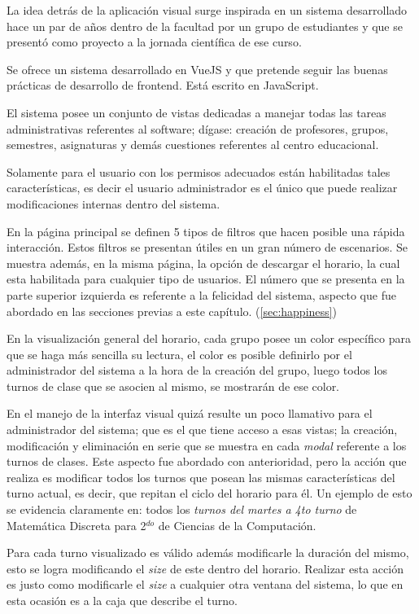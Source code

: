 La idea detrás de la aplicación visual surge inspirada en un sistema desarrollado hace un par de años dentro de la facultad por un grupo de estudiantes y que se presentó como proyecto a la jornada científica de ese curso. 

Se ofrece un sistema desarrollado en VueJS y que pretende seguir las buenas prácticas de desarrollo de frontend. Está escrito en JavaScript.

El sistema posee un conjunto de vistas dedicadas a manejar todas las tareas administrativas referentes al software; dígase: creación de profesores, grupos, semestres, asignaturas y demás cuestiones referentes al centro educacional. 

Solamente para el usuario con los permisos adecuados están habilitadas tales características, es decir el usuario administrador es el único que puede realizar modificaciones internas dentro del sistema.

En la página principal se definen 5 tipos de filtros que hacen posible una rápida interacción. Estos filtros se presentan útiles en un gran número de escenarios. Se muestra además, en la misma página, la opción de descargar el horario, la cual esta habilitada para cualquier tipo de usuarios. El número que se presenta en la parte superior izquierda es referente a la felicidad del sistema, aspecto que fue abordado en las secciones previas a este capítulo. (\ref{sec:happiness})

En la visualización general del horario, cada grupo posee un color específico para que se haga más sencilla su lectura, el color es posible definirlo por el administrador del sistema a la hora de la creación del grupo, luego todos los turnos de clase que se asocien al mismo, se mostrarán de ese color.

En el manejo de la interfaz visual quizá resulte un poco llamativo para el administrador del sistema; que es el que tiene acceso a esas vistas; la creación, modificación y eliminación en serie que se muestra en cada \textit{modal} referente a los turnos de clases.  Este aspecto fue abordado con anterioridad, pero la acción que realiza es modificar todos los turnos que posean las mismas características del turno actual, es decir, que repitan el ciclo del horario para él. Un ejemplo de esto se evidencia claramente en: todos los \textit{turnos del martes a 4to turno} de Matemática Discreta para 2$^{do}$ de Ciencias de la Computación.

Para cada turno visualizado es válido además modificarle la duración del mismo, esto se logra modificando el \textit{size} de este dentro del horario. Realizar esta acción es justo como modificarle el \textit{size} a cualquier otra ventana del sistema, lo que en esta ocasión es a la caja que describe el turno.

